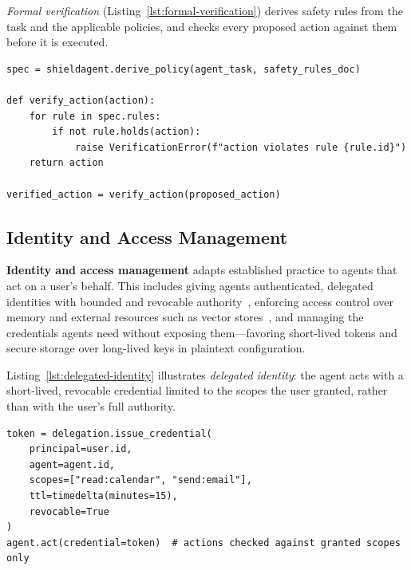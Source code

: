 \emph{Formal verification} (Listing~\ref{lst:formal-verification}) derives safety rules from the task and the applicable policies, and checks every proposed action against them before it is executed.

\noindent\begin{minipage}{\linewidth}
\begin{lstlisting}[caption={Formal verification: checking proposed agent actions against safety specifications, in the style of ShieldAgent~\cite{chen2025shieldagent}.}, label={lst:formal-verification}]
spec = shieldagent.derive_policy(agent_task, safety_rules_doc)

def verify_action(action):
    for rule in spec.rules:
        if not rule.holds(action):
            raise VerificationError(f"action violates rule {rule.id}")
    return action

verified_action = verify_action(proposed_action)
\end{lstlisting}
\end{minipage}


\subsection{Identity and Access Management}

\textbf{Identity and access management} adapts established practice to agents that act on a user's behalf. This includes giving agents authenticated, delegated identities with bounded and revocable authority~\cite{south2025delegation}, enforcing access control over memory and external resources such as vector stores~\cite{bedrock}, and managing the credentials agents need without exposing them—favoring short-lived tokens and secure storage over long-lived keys in plaintext configuration.

Listing~\ref{lst:delegated-identity} illustrates \emph{delegated identity}: the agent acts with a short-lived, revocable credential limited to the scopes the user granted, rather than with the user's full authority.

\noindent\begin{minipage}{\linewidth}
\begin{lstlisting}[caption={Delegated identity: bounded, revocable authority granted to an agent acting on a user's behalf~\cite{south2025delegation}.}, label={lst:delegated-identity}]
token = delegation.issue_credential(
    principal=user.id,
    agent=agent.id,
    scopes=["read:calendar", "send:email"],
    ttl=timedelta(minutes=15),
    revocable=True
)
agent.act(credential=token)  # actions checked against granted scopes only
\end{lstlisting}
\end{minipage}

